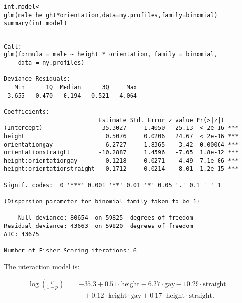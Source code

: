 \documentclass{beamer}\usepackage[]{graphicx}\usepackage[]{color}
\makeatletter
\newcommand{\hlopt}[1]{\textcolor[rgb]{1,0.894,0.769}{#1}}%
\newcommand{\hlstd}[1]{\textcolor[rgb]{1,0.894,0.769}{#1}}%
\newcommand{\hlkwb}[1]{\textcolor[rgb]{0.804,0.776,0.451}{#1}}%
\newcommand{\hlkwc}[1]{\textcolor[rgb]{0.78,0.941,0.545}{#1}}%
\newcommand{\hlkwd}[1]{\textcolor[rgb]{1,0.78,0.769}{#1}}%
\newenvironment{kframe}{%
 \def\at@end@of@kframe{}%
 \ifinner\ifhmode%
  \def\at@end@of@kframe{\end{minipage}}%
  \begin{minipage}{\columnwidth}%
 \fi\fi%
 \def\FrameCommand##1{\hskip\@totalleftmargin \hskip-\fboxsep
 \colorbox{shadecolor}{##1}\hskip-\fboxsep
     \hskip-\linewidth \hskip-\@totalleftmargin \hskip\columnwidth}%
 \MakeFramed {\advance\hsize-\width
   \@totalleftmargin\z@ \linewidth\hsize
   \@setminipage}}%
 {\par\unskip\endMakeFramed%
 \at@end@of@kframe}
\newenvironment{knitrout}{}{} %
\makeatother
\begin{document}
\begin{darkframes}
    \begin{frame}[fragile]
      \fontvsm
\begin{knitrout}
\begin{kframe}
\begin{alltt}
\hlstd{int.model} \hlkwb{<-} \hlkwd{glm}\hlstd{(male} \hlopt{~} \hlstd{height} \hlopt{*} \hlstd{orientation,} \hlkwc{data}\hlstd{=my.profiles,} \hlkwc{family}\hlstd{=binomial)}
\hlkwd{summary}\hlstd{(int.model)}
\end{alltt}
\begin{verbatim}

Call:
glm(formula = male ~ height * orientation, family = binomial, 
    data = my.profiles)

Deviance Residuals: 
   Min      1Q  Median      3Q     Max  
-3.655  -0.470   0.194   0.521   4.064  

Coefficients:
                           Estimate Std. Error z value Pr(>|z|)    
(Intercept)                -35.3027     1.4050  -25.13  < 2e-16 ***
height                       0.5076     0.0206   24.67  < 2e-16 ***
orientationgay              -6.2727     1.8365   -3.42  0.00064 ***
orientationstraight        -10.2887     1.4596   -7.05  1.8e-12 ***
height:orientationgay        0.1218     0.0271    4.49  7.1e-06 ***
height:orientationstraight   0.1712     0.0214    8.01  1.2e-15 ***
---
Signif. codes:  0 '***' 0.001 '**' 0.01 '*' 0.05 '.' 0.1 ' ' 1

(Dispersion parameter for binomial family taken to be 1)

    Null deviance: 80654  on 59825  degrees of freedom
Residual deviance: 43663  on 59820  degrees of freedom
AIC: 43675

Number of Fisher Scoring iterations: 6
\end{verbatim}
\end{kframe}
\end{knitrout}
    \end{frame}

    \begin{frame}
      The interaction model is:

      \begin{align*}
        \log\left(\frac{p}{1-p}\right) &=
          -35.3 +
          0.51\cdot\text{height}
          - 6.27\cdot\text{gay}
          - 10.29\cdot\text{straight} \\ & \qquad+
          0.12\cdot\text{height}\cdot\text{gay} +
          0.17\cdot\text{height}\cdot\text{straight}.
      \end{align*}
    \end{frame}


\end{darkframes}
\end{document}
